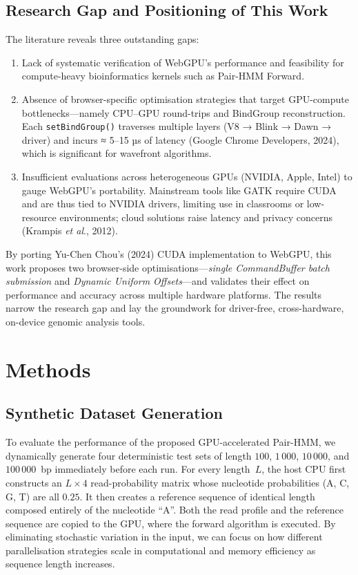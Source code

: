\documentclass[PhD]{PHlab-thesis}
\begin{document}
\section{Research Gap and Positioning of This Work}
The literature reveals three outstanding gaps:

\begin{enumerate}
  \item Lack of systematic verification of WebGPU's performance and feasibility for compute-heavy bioinformatics kernels such as Pair-HMM Forward.
  \item Absence of browser-specific optimisation strategies that target GPU-compute bottlenecks—namely CPU–GPU round-trips and BindGroup reconstruction. Each \verb|setBindGroup()| traverses multiple layers (V8 → Blink → Dawn → driver) and incurs ≈ 5–15 µs of latency (Google Chrome Developers, 2024), which is significant for wavefront algorithms.
  \item Insufficient evaluations across heterogeneous GPUs (NVIDIA, Apple, Intel) to gauge WebGPU's portability. Mainstream tools like GATK require CUDA and are thus tied to NVIDIA drivers, limiting use in classrooms or low-resource environments; cloud solutions raise latency and privacy concerns (Krampis \emph{et al}., 2012).
\end{enumerate}

By porting Yu-Chen Chou's (2024) CUDA implementation to WebGPU, this work proposes two browser-side optimisations—\emph{single CommandBuffer batch submission} and \emph{Dynamic Uniform Offsets}—and validates their effect on performance and accuracy across multiple hardware platforms. The results narrow the research gap and lay the groundwork for driver-free, cross-hardware, on-device genomic analysis tools.





\chapter{Methods}
\section{Synthetic Dataset Generation}\label{sec:dataset}
To evaluate the performance of the proposed GPU-accelerated Pair-HMM, we
dynamically generate four deterministic test sets of length
$100$, $1\,000$, $10\,000$, and $100\,000$~bp immediately before each run.
For every length~$L$, the host CPU first constructs an
$L\times4$ read-probability matrix whose nucleotide probabilities
(A, C, G, T) are all $0.25$.
It then creates a reference sequence of identical length composed entirely
of the nucleotide “A”.
Both the read profile and the reference sequence are copied to the GPU,
where the forward algorithm is executed.
By eliminating stochastic variation in the input, we can focus on how
different parallelisation strategies scale in computational and memory
efficiency as sequence length increases.
\end{document}
